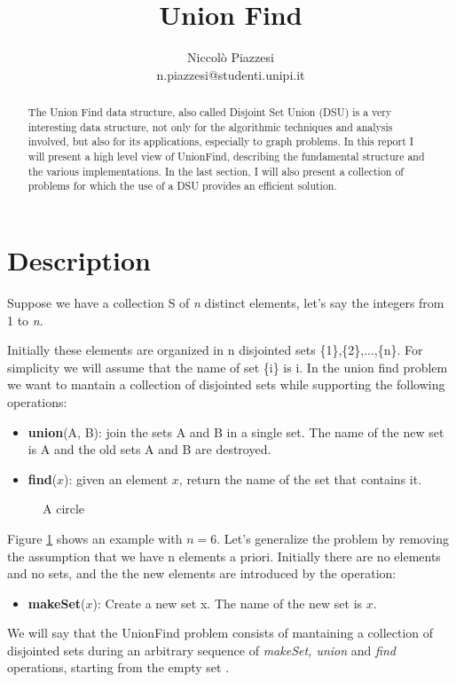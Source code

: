 \documentclass{article}
\newcommand{\nodes}[1]{%
    \foreach \num [count=\n starting from 0] in {#1}{%
      \node[minimum size=3mm, draw, circle] (n\n) at (\n,0) {\num};
    }
}
\begin{document}
\title{ \textbf{Union Find}}
\author{Niccolò Piazzesi\\n.piazzesi@studenti.unipi.it}
\date{}
\maketitle
\begin{abstract}
The Union Find data structure, also called Disjoint Set Union (DSU) is a very interesting data structure, not 
only  for the algorithmic techniques and  analysis involved, but also for its applications, especially to graph problems. In this
report I will present a high level view of UnionFind, describing the fundamental structure and the various implementations. In the last section, I will also present
a collection of problems for which the use of a DSU provides an efficient solution.
\end{abstract}
\section{Description}
Suppose we have a collection S of \emph{n} distinct elements, let's say the integers from 1 to \emph{n}. 

Initially these elements
are organized in n disjointed sets \{1\},\{2\},...,\{n\}. For simplicity we will assume that the name of set \{i\}
is i. In the union find problem we want to mantain a collection of disjointed sets while supporting the following operations:
\begin{itemize}
    \item \textbf{union}(A, B): join the sets A and B in a single set. The name of the new set is A and the old sets A and B are destroyed.
    \item \textbf{find}($x$): given an element $x$, return the name of the set that contains it.
\end{itemize}
\begin{figure}
    \centering

    
    \caption{A circle}
    \label{fig:circle}
\end{figure}
Figure \ref{fig:circle} shows an example  with $n=6$. Let's generalize the problem by removing the assumption that we have n elements a priori.
Initially there are no elements and no sets, and the the new elements are introduced by the operation:\begin{itemize}
    \item \textbf{makeSet}($x$): Create a new set {x}. The name of the new set is $x$.
\end{itemize}
We will say that the UnionFind problem consists of mantaining a collection of disjointed sets during 
an arbitrary sequence of \emph{makeSet, union} and \emph{find} operations, starting from the empty set \cite{demetrescu}.
\end{document}
